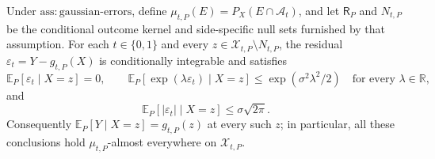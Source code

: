 Under \(\mathrm{ass:gaussian\text{-}errors}\), define \(\mu_{t,P}(E)=P_X(E\cap\mathcal A_t)\), and let \(\mathsf R_P\) and \(N_{t,P}\) be the conditional outcome kernel and side-specific null sets furnished by that assumption. For each \(t\in\{0,1\}\) and every \(z\in\mathcal X_{t,P}\setminus N_{t,P}\), the residual \(\varepsilon_t=Y-g_{t,P}(X)\) is conditionally integrable and satisfies
\[
 \mathbb E_P[\varepsilon_t\mid X=z]=0,\qquad
 \mathbb E_P[\exp(\lambda\varepsilon_t)\mid X=z]\le \exp(\sigma^2\lambda^2/2)\quad\text{for every }\lambda\in\mathbb R,
\]
and
\[
 \mathbb E_P[|\varepsilon_t|\mid X=z]\le \sigma\sqrt{2\pi}.
\]
Consequently \(\mathbb E_P[Y\mid X=z]=g_{t,P}(z)\) at every such \(z\); in particular, all these conclusions hold \(\mu_{t,P}\)-almost everywhere on \(\mathcal X_{t,P}\).
